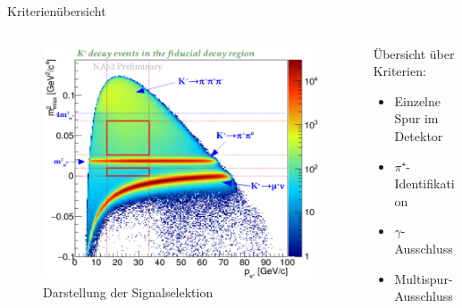 \documentclass[aspectratio=1610, professionalfonts, 9pt, t]{beamer}
\begin{document}
  \begin{frame}{Kriterienübersicht}
      \begin{columns}[onlytextwidth]
        \begin{column}{0.4\textwidth}
          \begin{figure}[ht]
            \begin{center}
              \includegraphics[height=0.8\textheight]{Images/na62decayregion.png} %
              \caption{Darstellung der Signalselektion}
            \end{center}
          \end{figure}
        \end{column}
        \begin{column}{0.5\textwidth}
          Übersicht über Kriterien:
          \begin{itemize}
            \item Einzelne Spur im Detektor
            \item $\pi⁺$-Identifikation
            \item $\gamma$-Ausschluss
            \item Multispur-Ausschluss
          \end{itemize}
        \end{column}
      \end{columns}
  \end{frame}
\end{document}
